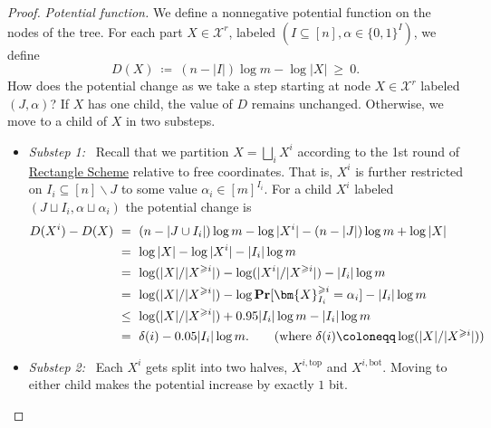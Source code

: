 \documentclass{toc}
\newcommand{\rectscheme}{\hyperref[alg:partition]{Rectangle Scheme}\xspace}
\renewcommand{\Pr}{\mathbf{Pr}}
\newcommand{\X}{\bm{X}}
\newcommand{\calX}{\mathcal{X}}
\newcommand{\topp}{\text{top}}
\newcommand{\bott}{\text{bot}}
\begin{document}
\begin{proof}
\emph{Potential function.}
We define a nonnegative potential function on the nodes of the tree. For each part $X\in\calX^r$, labeled $(I\subseteq[n],\alpha\in\{0,1\}^I)$, we define
\[
D(X)~\coloneqq~(n-|I|)\log m - \log|X|~\geq~0.
\]
How does the potential change as we take a step starting at node $X\in\calX^r$ labeled $(J,\alpha)$? If $X$ has one child, the value of $D$ remains unchanged. Otherwise, we move to a child of $X$ in two substeps.
	\begin{itemize}[itemsep=1mm]
		\item \emph{Substep 1:}~ Recall that we partition $X =\bigsqcup_i X^i$ according to the 1st round of \rectscheme relative to free coordinates. That is, $X^i$ is further restricted on $I_i\subseteq[n]\smallsetminus J$ to some value $\alpha_i\in[m]^{I_i}$. For a child $X^i$ labeled $(J\sqcup I_i,\alpha\sqcup\alpha_i)$ the potential change is
		\begin{align*}
		D(X^i)-D(X)~
		&=~(n-|J\cup I_i|)\log m - \log|X^i| - (n-|J|)\log m + \log|X|\\
		&=~\log|X| - \log |X^i| - |I_i|\log m\\
		&=~\log(|X|/|X^{\geqslant i}|) - \log(|X^i|/|X^{\geqslant i}|) - |I_i|\log m\\
		&=~\log(|X|/|X^{\geqslant i}|) - \log\Pr[\X^{\geqslant i}_{I_i} = \alpha_i] - |I_i|\log m\\
		&\leq~\log(|X|/|X^{\geqslant i}|) + 0.95|I_i|\log m - |I_i|\log m\\
		&=~\delta(i) - 0.05|I_i|\log m.\tag{where $\delta(i)\coloneqq\log(|X|/|X^{\geqslant i}|)$}
		\end{align*}
		
		\item \emph{Substep 2:}~ Each $X^i$ gets split into two halves, $X^{i,\topp}$ and $X^{i,\bott}$. Moving to either child makes the potential increase by exactly $1$ bit.
\end{itemize}
	

\end{proof}
\end{document}
